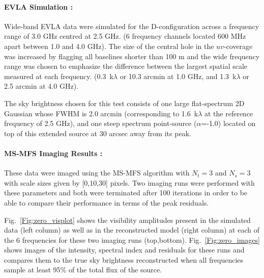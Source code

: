 \documentclass[structabstract]{stylefiles/aa}
\begin{document}
\paragraph{EVLA Simulation : }
Wide-band EVLA data were simulated for the D-configuration
across a frequency range of 3.0 GHz centred at 2.5 GHz.
(6 frequency channels located 600 MHz apart between 1.0 and 4.0 GHz).
The size of the central hole in the $uv$-coverage was increased
by flagging all baselines shorter than 100 m 
and the wide frequency range was chosen to emphasize the difference
between the largest spatial scale measured at each frequency.
(0.3~k$\lambda$ or 10.3 arcmin at 1.0 GHz, 
 and 1.3~k$\lambda$ or 2.5 arcmin at 4.0 GHz).

The sky brightness chosen for this test consists of one large
flat-spectrum 2D Gaussian whose FWHM is 2.0 arcmin (corresponding
to 1.6~k$\lambda$ at the reference frequency of 2.5 GHz), and one
steep spectrum point-source ($\alpha$=-1.0) located on top of
this extended source at 30 arcsec away from its peak.

\paragraph{MS-MFS Imaging Results : }
These data were imaged using the MS-MFS algorithm with $N_t=3$ and
$N_s=3$ with scale sizes given by [0,10,30] pixels. 
Two imaging runs were performed with these parameters and both
were terminated after 100 iterations in order to be able to
compare their performance in terms of the peak residuals.

\noindent Fig.~\ref{Fig:zero_visplot} shows the visibility amplitudes 
present in the simulated data (left column) as well as in the reconstructed model 
(right column) at each of the 6 frequencies for these two imaging runs (top,bottom).
Fig.~\ref{Fig:zero_images} shows images of the intensity, spectral
index and residuals for these runs and compares them to the true sky brightness
reconstructed when all frequencies sample at least 95\% of the total
flux of the source.
\end{document}
